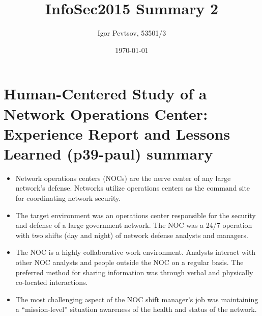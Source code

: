 \documentclass[14pt]{article}
\title{InfoSec2015 Summary 2}
\date{\today}
\author{Igor Pevtsov, 53501/3}
\begin{document}
  	\maketitle

	\section{Human-Centered Study of a Network Operations Center: Experience Report and Lessons Learned (p39-paul) summary}
	\begin{itemize}
	\item  Network operations centers (NOCs) are the nerve center of any large network’s defense. Networks utilize operations centers as the command site for coordinating network security.
	\item The target environment was an operations center responsible for the security and defense of a large government network. The NOC was a 24/7 operation with two shifts (day and night) of network defense analysts and managers.
	\item The NOC is a highly collaborative work environment.  Analysts interact with other NOC analysts and people outside the NOC on a regular basis. The preferred method for sharing information was through verbal and physically co-located interactions.
	\item The most challenging aspect of the NOC shift manager’s job was maintaining a “mission-level” situation awareness of the health and status of the network.
	\end{itemize}
\end{document}
